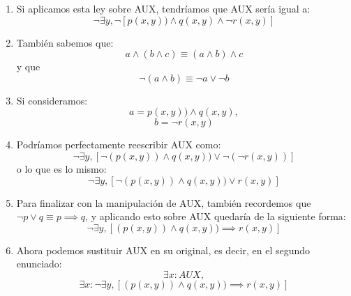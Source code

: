 \documentclass[../main.tex]{subfiles}
\begin{document}
\begin{enumerate}
    \item Si aplicamos esta ley sobre AUX, tendríamos que AUX sería igual a: 
    \begin{equation*}
        \neg \exists y, \neg [p(x,y)) \land q(x,y) \land \neg r(x,y)]
    \end{equation*}
    
    \item También sabemos que:
    \begin{equation*}
        a \land (b \land c) \equiv (a \land b) \land c
    \end{equation*}
    y que 
    \begin{equation*}
        \neg (a \land b) \equiv \neg a \lor \neg b
    \end{equation*}
    
    \item Si consideramos:
    \begin{equation*}
        a = p(x,y)) \land q(x,y),
    \end{equation*}
    \begin{equation*}
        b= \neg r(x,y)
    \end{equation*}
    
    \item Podríamos perfectamente reescribir AUX como: 
    \begin{equation*}
        \neg \exists y, [\neg (p(x,y)) \land q(x,y)) \lor \neg(\neg r(x,y))]
    \end{equation*}
    o lo que es lo mismo:
    \begin{equation*}
        \neg \exists y, [\neg (p(x,y)) \land q(x,y)) \lor r(x,y)]
    \end{equation*}
    
    \item Para finalizar con la manipulación de AUX, también recordemos que $\neg p \lor q \equiv p \implies q$, y aplicando esto sobre AUX quedaría de la siguiente forma:
    \begin{equation*}
        \neg \exists y, [(p(x,y)) \land q(x,y)) \implies r(x,y)]
    \end{equation*}
    
    \item Ahora podemos sustituir AUX en su original, es decir, en el segundo enunciado:
    \begin{equation*}
        \exists x : AUX,
    \end{equation*}
    \begin{equation*}
        \exists x : \neg \exists y, [(p(x,y)) \land q(x,y)) \implies r(x,y)]
    \end{equation*}
    

\end{enumerate}
\end{document}
